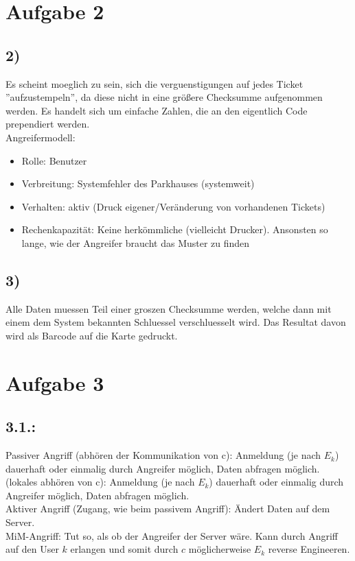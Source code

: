 \documentclass[a4paper,11pt,parskip=half]{scrartcl}
\begin{document}
\section*{Aufgabe 2}
\subsection*{2)}
Es scheint moeglich zu sein, sich die verguenstigungen auf
jedes Ticket ''aufzustempeln'', da diese nicht in eine größere
Checksumme aufgenommen werden. Es handelt sich um einfache
Zahlen, die an den eigentlich Code prependiert werden. \\
Angreifermodell:
\begin{itemize}
	\item Rolle: Benutzer
    \item Verbreitung: Systemfehler des Parkhauses (systemweit)
    \item Verhalten: aktiv (Druck eigener/Veränderung von vorhandenen Tickets)
    \item Rechenkapazität: Keine herkömmliche (vielleicht Drucker). Ansonsten so lange, wie der Angreifer braucht das Muster zu finden
\end{itemize}



\subsection*{3)}
Alle Daten muessen Teil einer groszen Checksumme
werden, welche dann mit einem dem System bekannten Schluessel
verschluesselt wird. Das Resultat davon wird als Barcode auf
die Karte gedruckt.

\section*{Aufgabe 3}
\subsection*{3.1.:}
Passiver Angriff (abhören der Kommunikation von c): Anmeldung (je nach \(E_k\)) dauerhaft oder einmalig durch Angreifer möglich, Daten abfragen möglich. \\
\quad (lokales abhören von c): Anmeldung (je nach \(E_k\)) dauerhaft oder einmalig durch Angreifer möglich, Daten abfragen möglich. \\
Aktiver Angriff (Zugang, wie beim passivem Angriff): Ändert Daten auf dem Server. \\
\quad MiM-Angriff: Tut so, als ob der Angreifer der Server wäre. Kann durch Angriff auf den User \(k\) erlangen und somit durch \(c\) möglicherweise \(E_k\) reverse Engineeren.
\end{document}
